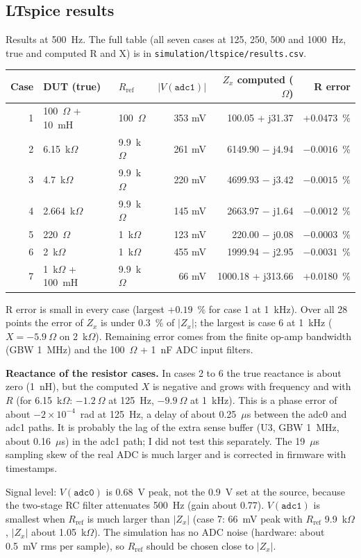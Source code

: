 \documentclass[11pt,a4paper]{article}
\newcommand{\Rref}{R_{\mathrm{ref}}}
\newcommand{\Zx}{Z_x}
\begin{document}
\subsection{LTspice results}
Results at 500~Hz. The full table (all seven cases at 125, 250, 500 and 1000~Hz, true and computed R and X) is in \texttt{simulation/ltspice/results.csv}.
\begin{center}
\small
\begin{tabular}{rllrrr}
\toprule
Case & DUT (true) & $\Rref$ & $|V(\texttt{adc1})|$ & $\Zx$ computed ($\Omega$) & R error \\
\midrule
1 & 100~$\Omega$ + 10~mH & 100~$\Omega$ & 353 mV & 100.05 + j31.37 & +0.0473~\% \\
2 & 6.15~k$\Omega$ & 9.9~k$\Omega$ & 261 mV & 6149.90 $-$ j4.94 & $-0.0016$~\% \\
3 & 4.7~k$\Omega$ & 9.9~k$\Omega$ & 220 mV & 4699.93 $-$ j3.42 & $-0.0015$~\% \\
4 & 2.664~k$\Omega$ & 9.9~k$\Omega$ & 145 mV & 2663.97 $-$ j1.64 & $-0.0012$~\% \\
5 & 220~$\Omega$ & 1~k$\Omega$ & 123 mV & 220.00 $-$ j0.08 & $-0.0003$~\% \\
6 & 2~k$\Omega$ & 1~k$\Omega$ & 455 mV & 1999.94 $-$ j2.95 & $-0.0031$~\% \\
7 & 1~k$\Omega$ + 100~mH & 9.9~k$\Omega$ & 66 mV & 1000.18 + j313.66 & +0.0180~\% \\
\bottomrule
\end{tabular}
\end{center}
R error is small in every case (largest $+0.19$~\% for case 1 at 1~kHz). Over all 28 points the error of $\Zx$ is under 0.3~\% of $|\Zx|$; the largest is case 6 at 1~kHz ($X = -5.9~\Omega$ on 2~k$\Omega$). Remaining error comes from the finite op-amp bandwidth (GBW 1~MHz) and the 100~$\Omega$ + 1~nF ADC input filters.

\textbf{Reactance of the resistor cases.} In cases 2 to 6 the true reactance is about zero (1~nH), but the computed $X$ is negative and grows with frequency and with $R$ (for 6.15~k$\Omega$: $-1.2~\Omega$ at 125~Hz, $-9.9~\Omega$ at 1~kHz). This is a phase error of about $-2\times10^{-4}$~rad at 125~Hz, a delay of about 0.25~$\mu$s between the adc0 and adc1 paths. It is probably the lag of the extra sense buffer (U3, GBW 1~MHz, about 0.16~$\mu$s) in the adc1 path; I did not test this separately. The 19~$\mu$s sampling skew of the real ADC is much larger and is corrected in firmware with timestamps.

Signal level: $V(\texttt{adc0})$ is 0.68~V peak, not the 0.9~V set at the source, because the two-stage RC filter attenuates 500~Hz (gain about 0.77). $V(\texttt{adc1})$ is smallest when $\Rref$ is much larger than $|\Zx|$ (case 7: 66~mV peak with $\Rref$ 9.9~k$\Omega$, $|\Zx|$ about 1.05~k$\Omega$). The simulation has no ADC noise (hardware: about 0.5~mV rms per sample), so $\Rref$ should be chosen close to $|\Zx|$.
\end{document}
